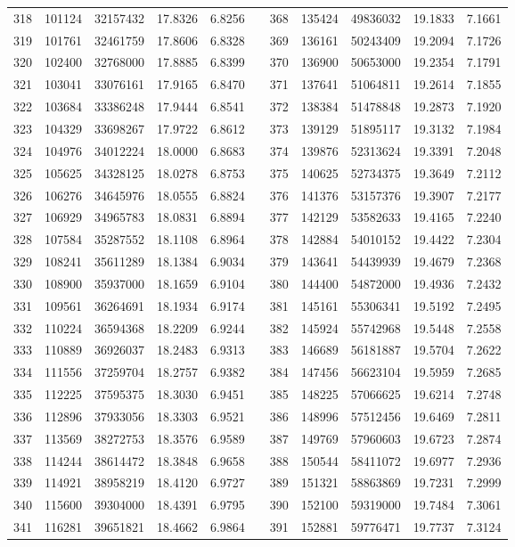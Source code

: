 \begin{longtable}{rrrrrrrrrrr}
318&101124&32157432&17.8326&6.8256&&368&135424&49836032&19.1833&7.1661\\
319&101761&32461759&17.8606&6.8328&&369&136161&50243409&19.2094&7.1726\\
320&102400&32768000&17.8885&6.8399&&370&136900&50653000&19.2354&7.1791\\
321&103041&33076161&17.9165&6.8470&&371&137641&51064811&19.2614&7.1855\\
322&103684&33386248&17.9444&6.8541&&372&138384&51478848&19.2873&7.1920\\
323&104329&33698267&17.9722&6.8612&&373&139129&51895117&19.3132&7.1984\\
324&104976&34012224&18.0000&6.8683&&374&139876&52313624&19.3391&7.2048\\
325&105625&34328125&18.0278&6.8753&&375&140625&52734375&19.3649&7.2112\\
326&106276&34645976&18.0555&6.8824&&376&141376&53157376&19.3907&7.2177\\
327&106929&34965783&18.0831&6.8894&&377&142129&53582633&19.4165&7.2240\\
328&107584&35287552&18.1108&6.8964&&378&142884&54010152&19.4422&7.2304\\
329&108241&35611289&18.1384&6.9034&&379&143641&54439939&19.4679&7.2368\\
330&108900&35937000&18.1659&6.9104&&380&144400&54872000&19.4936&7.2432\\
331&109561&36264691&18.1934&6.9174&&381&145161&55306341&19.5192&7.2495\\
332&110224&36594368&18.2209&6.9244&&382&145924&55742968&19.5448&7.2558\\
333&110889&36926037&18.2483&6.9313&&383&146689&56181887&19.5704&7.2622\\
334&111556&37259704&18.2757&6.9382&&384&147456&56623104&19.5959&7.2685\\
335&112225&37595375&18.3030&6.9451&&385&148225&57066625&19.6214&7.2748\\
336&112896&37933056&18.3303&6.9521&&386&148996&57512456&19.6469&7.2811\\
337&113569&38272753&18.3576&6.9589&&387&149769&57960603&19.6723&7.2874\\
338&114244&38614472&18.3848&6.9658&&388&150544&58411072&19.6977&7.2936\\
339&114921&38958219&18.4120&6.9727&&389&151321&58863869&19.7231&7.2999\\
340&115600&39304000&18.4391&6.9795&&390&152100&59319000&19.7484&7.3061\\
341&116281&39651821&18.4662&6.9864&&391&152881&59776471&19.7737&7.3124\\

\end{longtable}
